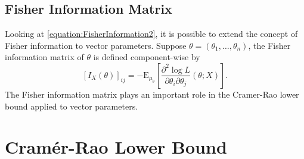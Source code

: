 \subsection{Fisher Information Matrix}

Looking at \eqref{equation:FisherInformation2}, it is possible to extend the concept of Fisher information to vector parameters.
Suppose $\theta = (\theta_1, \ldots, \theta_n)$, the Fisher information matrix of $\theta$ is defined component-wise by
\begin{equation} \label{equation:FisherInformationMatrix}
\left[ I_X (\theta) \right]_{ij}
= - \mathrm{E}_{\mu_{\theta}} \left[ \frac{\partial^2 \log L}{\partial \theta_i \partial \theta_j} (\theta; X) \right] .
\end{equation}
The Fisher information matrix plays an important role in the Cramer-Rao lower bound applied to vector parameters.


\section{Cram\'{e}r-Rao Lower Bound}


